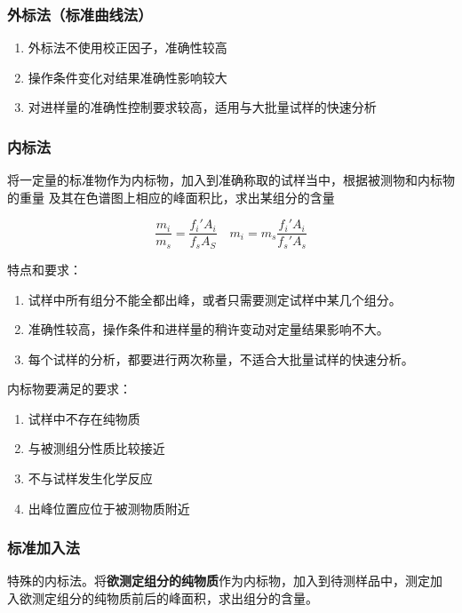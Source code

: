 \subsubsection{外标法（标准曲线法）}

\begin{enumerate}
    \item 外标法不使用校正因子，准确性较高
    \item 操作条件变化对结果准确性影响较大
    \item 对进样量的准确性控制要求较高，适用与大批量试样的快速分析
\end{enumerate}

\subsubsection{内标法}

将一定量的标准物作为内标物，加入到准确称取的试样当中，根据被测物和内标物的重量
及其在色谱图上相应的峰面积比，求出某组分的含量

\begin{equation}
    \frac{m_i}{m_s} = \frac{f_i' A_i}{f_s A_S} \quad
    m_i = m_s \frac{f_i' A_i}{f_s' A_s}
\end{equation}


特点和要求：

\begin{enumerate}
    \item 试样中所有组分不能全都出峰，或者只需要测定试样中某几个组分。
    \item 准确性较高，操作条件和进样量的稍许变动对定量结果影响不大。
    \item 每个试样的分析，都要进行两次称量，不适合大批量试样的快速分析。
\end{enumerate}


内标物要满足的要求：

\begin{enumerate}
    \item 试样中不存在纯物质
    \item 与被测组分性质比较接近
    \item 不与试样发生化学反应
    \item 出峰位置应位于被测物质附近
\end{enumerate}

\subsubsection{标准加入法}

特殊的内标法。将\textbf{欲测定组分的纯物质}作为内标物，加入到待测样品中，测定加
入欲测定组分的纯物质前后的峰面积，求出组分的含量。

